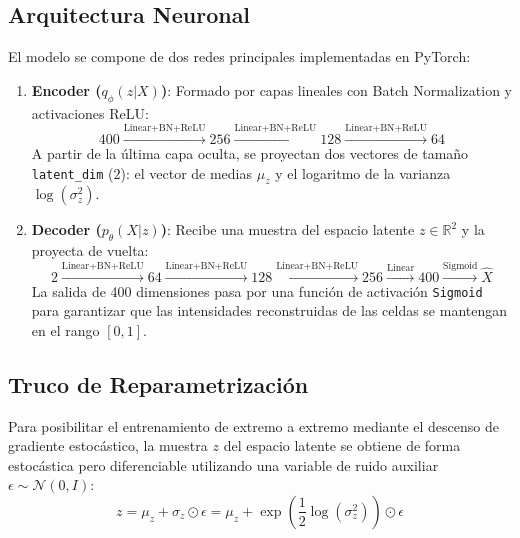 \documentclass[12pt,letterpaper]{article}
\begin{document}
\subsection{Arquitectura Neuronal}
El modelo se compone de dos redes principales implementadas en PyTorch:
\begin{enumerate}
    \item \textbf{Encoder ($q_\phi(z|X)$)}: Formado por capas lineales con Batch Normalization y activaciones ReLU:
    \begin{equation}
        400 \xrightarrow{\text{Linear+BN+ReLU}} 256 \xrightarrow{\text{Linear+BN+ReLU}} 128 \xrightarrow{\text{Linear+BN+ReLU}} 64
    \end{equation}
    A partir de la última capa oculta, se proyectan dos vectores de tamaño \texttt{latent\_dim} ($2$): el vector de medias $\mu_z$ y el logaritmo de la varianza $\log(\sigma_z^2)$.
    \item \textbf{Decoder ($p_\theta(X|z)$)}: Recibe una muestra del espacio latente $z \in \mathbb{R}^2$ y la proyecta de vuelta:
    \begin{equation}
        2 \xrightarrow{\text{Linear+BN+ReLU}} 64 \xrightarrow{\text{Linear+BN+ReLU}} 128 \xrightarrow{\text{Linear+BN+ReLU}} 256 \xrightarrow{\text{Linear}} 400 \xrightarrow{\text{Sigmoid}} \hat{X}
    \end{equation}
    La salida de 400 dimensiones pasa por una función de activación \texttt{Sigmoid} para garantizar que las intensidades reconstruidas de las celdas se mantengan en el rango $[0, 1]$.
\end{enumerate}

\subsection{Truco de Reparametrización}
Para posibilitar el entrenamiento de extremo a extremo mediante el descenso de gradiente estocástico, la muestra $z$ del espacio latente se obtiene de forma estocástica pero diferenciable utilizando una variable de ruido auxiliar $\epsilon \sim \mathcal{N}(0, I)$:
\begin{equation}
    z = \mu_z + \sigma_z \odot \epsilon = \mu_z + \exp\left(\frac{1}{2}\log(\sigma_z^2)\right) \odot \epsilon
\end{equation}
\end{document}

